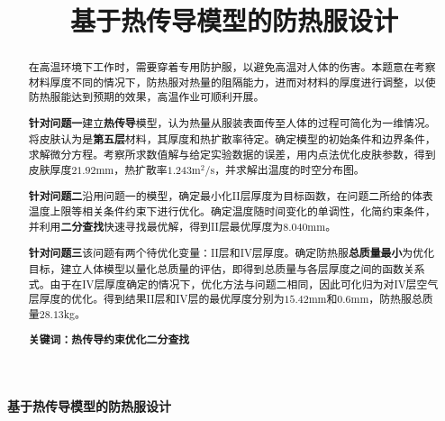 \documentclass{xcumcmart}
\title{基于热传导模型的防热服设计}
\begin{document}
\begin{minipage}{0.9\textwidth}
\centering\LARGE\textbf{基于热传导模型的防热服设计}
\end{minipage}

\par
\par\par
\renewcommand{\abstractname}{摘\quad 要} 
\begin{abstract}
在高温环境下工作时，需要穿着专用防护服，以避免高温对人体的伤害。本题意在考察材料厚度不同的情况下，防热服对热量的阻隔能力，进而对材料的厚度进行调整，以使防热服能达到预期的效果，高温作业可顺利开展。\par
\textbf{针对问题一}\quad 建立\textbf{热传导}模型，认为热量从服装表面传至人体的过程可简化为一维情况。将皮肤认为是\textbf{第五层}材料，其厚度和热扩散率待定。确定模型的初始条件和边界条件，求解微分方程。考察所求数值解与给定实验数据的误差，用内点法优化皮肤参数，得到皮肤厚度$21.92$mm，热扩散率$1.243\mathrm{m^2/s}$，并求解出温度的时空分布图。\par
\textbf{针对问题二}\quad 沿用问题一的模型，确定最小化II层厚度为目标函数，在问题二所给的体表温度上限等相关条件约束下进行优化。确定温度随时间变化的单调性，化简约束条件，并利用\textbf{二分查找}快速寻找最优解，得到II层最优厚度为$8.040$mm。\par
\textbf{针对问题三}\quad 该问题有两个待优化变量：II层和IV层厚度。确定防热服\textbf{总质量最小}为优化目标，建立人体模型以量化总质量的评估，即得到总质量与各层厚度之间的函数关系式。由于在IV层厚度确定的情况下，优化方法与问题二相同，因此可化归为对IV层空气层厚度的优化。得到结果II层和IV层的最优厚度分别为$15.42$mm和$0.6$mm，防热服总质量$28.13$kg。\par

\textbf{关键词：\quad 热传导\quad 约束优化\quad 二分查找}
\end{abstract}
\end{document}
